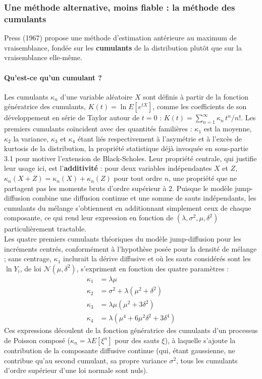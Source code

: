 \documentclass{article}
\begin{document}
\subsubsection*{Une méthode alternative, moins fiable : la méthode des cumulants}
Press (1967) propose une méthode d'estimation antérieure au maximum de vraisemblance, fondée sur les \textbf{cumulants} de la distribution plutôt que sur la vraisemblance elle-même.
\paragraph{Qu'est-ce qu'un cumulant ?} Les cumulants $\kappa_n$ d'une variable aléatoire $X$ sont définis à partir de la fonction génératrice des cumulants, $K(t) = \ln E[e^{tX}]$, comme les coefficients de son développement en série de Taylor autour de $t=0$ : $K(t) = \sum_{n=1}^{\infty} \kappa_n\, t^n/n!$. Les premiers cumulants coïncident avec des quantités familières : $\kappa_1$ est la moyenne, $\kappa_2$ la variance, $\kappa_3$ et $\kappa_4$ étant liés respectivement à l'asymétrie et à l'excès de kurtosis de la distribution, la propriété statistique déjà invoquée en sous-partie 3.1 pour motiver l'extension de Black-Scholes. Leur propriété centrale, qui justifie leur usage ici, est l'\textbf{additivité} : pour deux variables indépendantes $X$ et $Z$, $\kappa_n(X+Z)=\kappa_n(X)+\kappa_n(Z)$ pour tout ordre $n$, une propriété que ne partagent pas les moments bruts d'ordre supérieur à 2. Puisque le modèle jump-diffusion combine une diffusion continue et une somme de sauts indépendants, les cumulants du mélange s'obtiennent en additionnant simplement ceux de chaque composante, ce qui rend leur expression en fonction de $(\lambda,\sigma^2,\mu,\delta^2)$ particulièrement tractable.\\
Les quatre premiers cumulants théoriques du modèle jump-diffusion pour les incréments centrés, conformément à l'hypothèse posée pour la densité de mélange ; sans centrage, $\kappa_1$ inclurait la dérive diffusive et où les sauts considérés sont les $\ln Y_i$, de loi $\mathcal{N}(\mu,\delta^2)$, s'expriment en fonction des quatre paramètres :
\begin{align}
\kappa_1 &= \lambda\mu \\
\kappa_2 &= \sigma^2 + \lambda(\mu^2+\delta^2) \\
\kappa_3 &= \lambda\mu(\mu^2+3\delta^2) \\
\kappa_4 &= \lambda(\mu^4+6\mu^2\delta^2+3\delta^4)
\end{align}
Ces expressions découlent de la fonction génératrice des cumulants d'un processus de Poisson composé ($\kappa_n = \lambda E[\xi^n]$ pour des sauts $\xi$), à laquelle s'ajoute la contribution de la composante diffusive continue (qui, étant gaussienne, ne contribue qu'au second cumulant, sa propre variance $\sigma^2$, tous les cumulants d'ordre supérieur d'une loi normale sont nuls).
\end{document}
